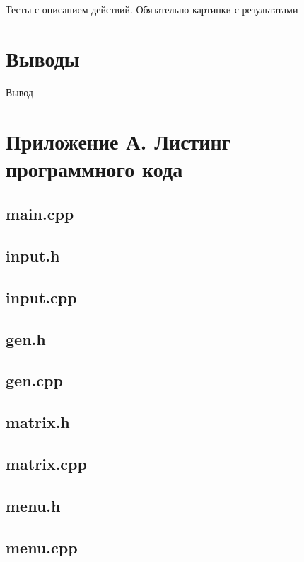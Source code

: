 \documentclass[12pt,a4paper]{article}  %
\begin{document}
	Тесты с описанием действий.
	Обязательно картинки с результатами

	\section*{Выводы}
	
	Вывод
	
	\newpage

	\section*{Приложение А. Листинг программного кода}

	
	\subsection*{main.cpp}
	
	\newpage

	\subsection*{input.h}
	
	\newpage

	\subsection*{input.cpp}
	
	\newpage

	\subsection*{gen.h}
	
	\newpage

	\subsection*{gen.cpp}
	
	\newpage

	\subsection*{matrix.h}
	
	\newpage

	\subsection*{matrix.cpp}
	
	\newpage

	\subsection*{menu.h}
	
	\newpage

	\subsection*{menu.cpp}
	
\end{document}
